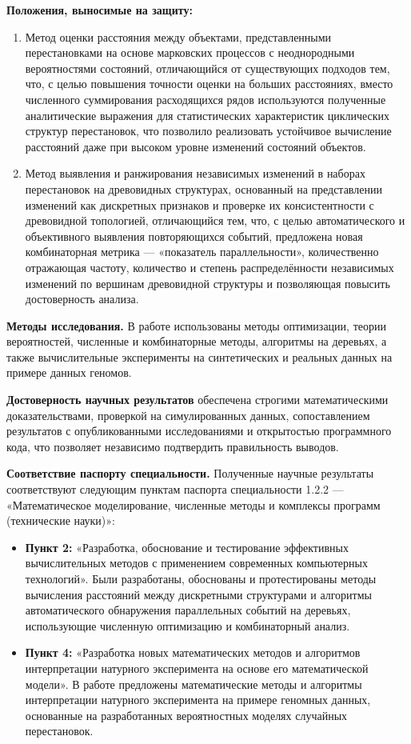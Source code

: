\textbf{Положения, выносимые на защиту:}
\begin{enumerate}
    \item Метод оценки расстояния между объектами, представленными перестановками на основе марковских процессов с неоднородными вероятностями состояний, отличающийся от существующих подходов тем, что, с целью повышения точности оценки на больших расстояниях, вместо численного суммирования расходящихся рядов используются полученные аналитические выражения для статистических характеристик циклических структур перестановок, что позволило реализовать устойчивое вычисление расстояний даже при высоком уровне изменений состояний объектов.
    
    \item Метод выявления и ранжирования независимых изменений в наборах перестановок на древовидных структурах, основанный на представлении изменений как дискретных признаков и проверке их консистентности с древовидной топологией, отличающийся тем, что, с целью автоматического и объективного выявления повторяющихся событий, предложена новая комбинаторная метрика — «показатель параллельности», количественно отражающая частоту, количество и степень распределённости независимых изменений по вершинам древовидной структуры и позволяющая повысить достоверность анализа.
\end{enumerate}

\textbf{Методы исследования.} В работе использованы методы оптимизации, теории вероятностей, численные и комбинаторные методы, алгоритмы на деревьях, а также вычислительные эксперименты на синтетических и реальных данных на примере данных геномов.

\textbf{Достоверность научных результатов} обеспечена строгими математическими доказательствами, проверкой на симулированных данных, сопоставлением результатов с опубликованными исследованиями и открытостью программного кода, что позволяет независимо подтвердить правильность выводов.

\textbf{Соответствие паспорту специальности.} Полученные научные результаты соответствуют следующим пунктам паспорта специальности 1.2.2 — «Математическое моделирование, численные методы и комплексы программ (технические науки)»:

\begin{itemize}
    \item \textbf{Пункт 2:} «Разработка, обоснование и тестирование эффективных вычислительных методов с применением современных компьютерных технологий». Были разработаны, обоснованы и протестированы методы вычисления расстояний между дискретными структурами и алгоритмы автоматического обнаружения параллельных событий на деревьях, использующие численную оптимизацию и комбинаторный анализ.
    
    \item \textbf{Пункт 4:} «Разработка новых математических методов и алгоритмов интерпретации натурного эксперимента на основе его математической модели». В работе предложены математические методы и алгоритмы интерпретации натурного эксперимента на примере геномных данных, основанные на разработанных вероятностных моделях случайных перестановок.
\end{itemize}
